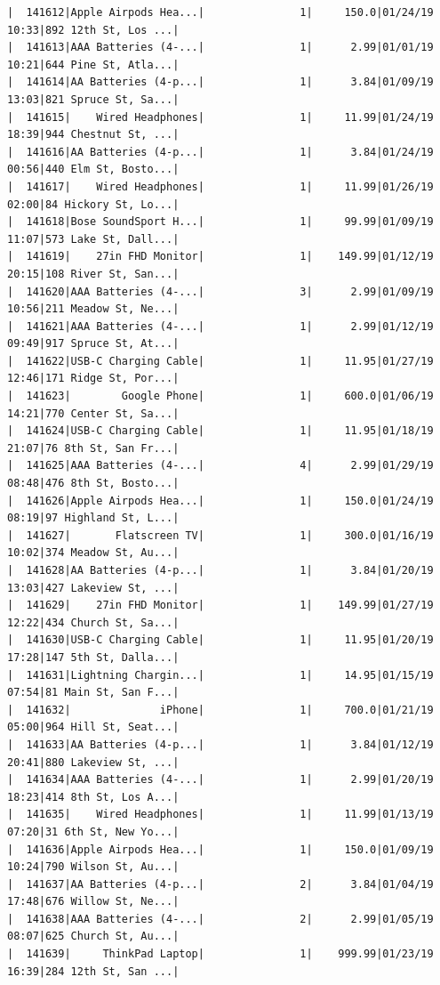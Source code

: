 \documentclass[
  letterpaper,
  DIV=11,
  numbers=noendperiod]{scrartcl}
\begin{document}
\begin{verbatim}
|  141612|Apple Airpods Hea...|               1|     150.0|01/24/19 10:33|892 12th St, Los ...|
|  141613|AAA Batteries (4-...|               1|      2.99|01/01/19 10:21|644 Pine St, Atla...|
|  141614|AA Batteries (4-p...|               1|      3.84|01/09/19 13:03|821 Spruce St, Sa...|
|  141615|    Wired Headphones|               1|     11.99|01/24/19 18:39|944 Chestnut St, ...|
|  141616|AA Batteries (4-p...|               1|      3.84|01/24/19 00:56|440 Elm St, Bosto...|
|  141617|    Wired Headphones|               1|     11.99|01/26/19 02:00|84 Hickory St, Lo...|
|  141618|Bose SoundSport H...|               1|     99.99|01/09/19 11:07|573 Lake St, Dall...|
|  141619|    27in FHD Monitor|               1|    149.99|01/12/19 20:15|108 River St, San...|
|  141620|AAA Batteries (4-...|               3|      2.99|01/09/19 10:56|211 Meadow St, Ne...|
|  141621|AAA Batteries (4-...|               1|      2.99|01/12/19 09:49|917 Spruce St, At...|
|  141622|USB-C Charging Cable|               1|     11.95|01/27/19 12:46|171 Ridge St, Por...|
|  141623|        Google Phone|               1|     600.0|01/06/19 14:21|770 Center St, Sa...|
|  141624|USB-C Charging Cable|               1|     11.95|01/18/19 21:07|76 8th St, San Fr...|
|  141625|AAA Batteries (4-...|               4|      2.99|01/29/19 08:48|476 8th St, Bosto...|
|  141626|Apple Airpods Hea...|               1|     150.0|01/24/19 08:19|97 Highland St, L...|
|  141627|       Flatscreen TV|               1|     300.0|01/16/19 10:02|374 Meadow St, Au...|
|  141628|AA Batteries (4-p...|               1|      3.84|01/20/19 13:03|427 Lakeview St, ...|
|  141629|    27in FHD Monitor|               1|    149.99|01/27/19 12:22|434 Church St, Sa...|
|  141630|USB-C Charging Cable|               1|     11.95|01/20/19 17:28|147 5th St, Dalla...|
|  141631|Lightning Chargin...|               1|     14.95|01/15/19 07:54|81 Main St, San F...|
|  141632|              iPhone|               1|     700.0|01/21/19 05:00|964 Hill St, Seat...|
|  141633|AA Batteries (4-p...|               1|      3.84|01/12/19 20:41|880 Lakeview St, ...|
|  141634|AAA Batteries (4-...|               1|      2.99|01/20/19 18:23|414 8th St, Los A...|
|  141635|    Wired Headphones|               1|     11.99|01/13/19 07:20|31 6th St, New Yo...|
|  141636|Apple Airpods Hea...|               1|     150.0|01/09/19 10:24|790 Wilson St, Au...|
|  141637|AA Batteries (4-p...|               2|      3.84|01/04/19 17:48|676 Willow St, Ne...|
|  141638|AAA Batteries (4-...|               2|      2.99|01/05/19 08:07|625 Church St, Au...|
|  141639|     ThinkPad Laptop|               1|    999.99|01/23/19 16:39|284 12th St, San ...|

\end{verbatim}
\end{document}
